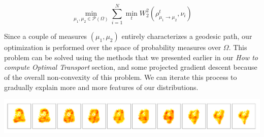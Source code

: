 $$
    \min_{\mu_1, \mu_2 \in \mathcal{P}(\Omega)}
        \sum_{i=1}^N \min_t W_2^2\left(\rho_{\mu_1 \to \mu_2}^t, \nu_i\right)
$$

Since a couple of measures $(\mu_1, \mu_2)$ entirely characterizes a
geodesic path, our optimization is performed over the space of probability
measures over $\Omega$. This problem can be solved using the methods that
we presented earlier in our \emph{How to compute Optimal Transport} section,
and some projected gradient descent because of the overall non-convexity of
this problem. We can iterate this process to gradually explain more and more
features of our distributions.

\begin{center}
    \centering
	\includegraphics[scale=0.3]{ims/MNIST_PCA.png}
\end{center}
